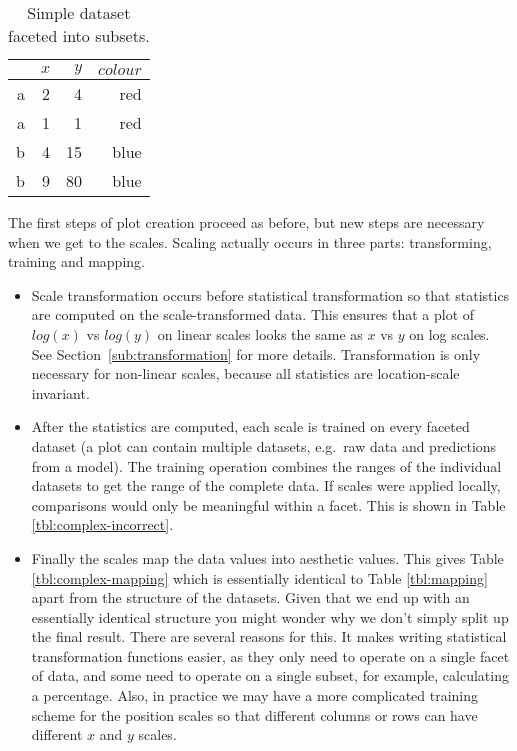 \begin{table}[ht]
	\centering
	\begin{tabular}{r|r|r|r}
		& $x$ & $y$ & $colour$\\
		\hline
		a & 2 & 4 & red\\
		a & 1 & 1 & red\\
		\hline \hline
		b & 4 & 15 & blue\\
		b & 9 & 80 & blue
	\end{tabular}

	\caption{Simple dataset faceted into subsets.}
	\label{tbl:complex}
\end{table}

The first steps of plot creation proceed as before, but new steps are necessary when we get to the scales.   Scaling actually occurs in three parts: transforming, training and mapping. 

\begin{itemize}
	\item  Scale transformation occurs before statistical transformation so that statistics are computed on the scale-transformed data.  This ensures that a plot of $log(x)$ vs $log(y)$ on linear scales looks the same as $x$ vs $y$ on log scales.  See Section~\ref{sub:transformation} for more details. Transformation is only necessary for non-linear scales, because all statistics are location-scale invariant.

	\item After the statistics are computed, each scale is trained on every faceted dataset (a plot can contain multiple datasets, e.g.\ raw data and predictions from a model).  The training operation combines the ranges of the individual datasets to get the range of the complete data.  If scales were applied locally, comparisons would only be meaningful within a facet.  This is shown in Table \ref{tbl:complex-incorrect}.

	\item Finally the scales map the data values into aesthetic values.  This gives Table \ref{tbl:complex-mapping} which is essentially identical to Table \ref{tbl:mapping} apart from the structure of the datasets.  Given that we end up with an essentially identical structure you might wonder why we don't simply split up the final result.  There are several reasons for this.  It makes writing statistical transformation functions easier, as they only need to operate on a single facet of data, and some need to operate on a single subset, for example, calculating a percentage.  Also, in practice we may have a more complicated training scheme for the position scales so that different columns or rows can have different $x$ and $y$ scales.  
	
\end{itemize}

